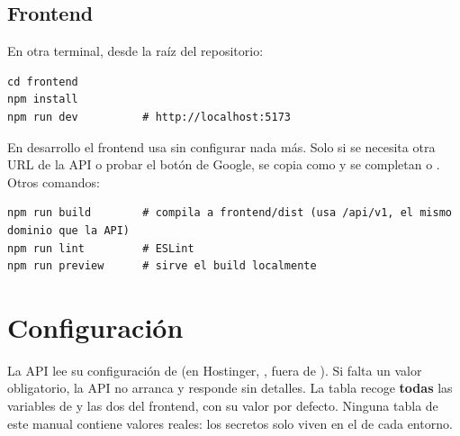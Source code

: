 \documentclass[11pt,a4paper]{article}
\begin{document}
\subsection{Frontend}

En otra terminal, desde la ra\'iz del repositorio:
\begin{lstlisting}[style=powershell]
cd frontend
npm install
npm run dev          # http://localhost:5173
\end{lstlisting}

En desarrollo el frontend usa  sin configurar nada m\'as. Solo si se necesita otra
URL de la API o probar el bot\'on de Google, se copia  como  y se
completan  o . Otros comandos:

\begin{lstlisting}[style=powershell]
npm run build        # compila a frontend/dist (usa /api/v1, el mismo dominio que la API)
npm run lint         # ESLint
npm run preview      # sirve el build localmente
\end{lstlisting}

\section{Configuraci\'on}\label{sec:config}

La API lee su configuraci\'on de  (en Hostinger, , fuera de ).
Si falta un valor obligatorio, la API no arranca y responde  sin detalles. La tabla recoge
\textbf{todas} las variables de  y las dos del frontend, con su valor por defecto. Ninguna
tabla de este manual contiene valores reales: los secretos solo viven en el  de cada entorno.
\end{document}
